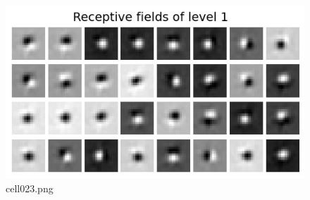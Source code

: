 \begin{figure}[ht]
	\centering
	\includegraphics[scale=0.8, max width=\linewidth]{./fig/energy-based-model/predictive-coding/cell023.png}
	\caption{cell023.png}
	\label{cell023.png}
\end{figure}